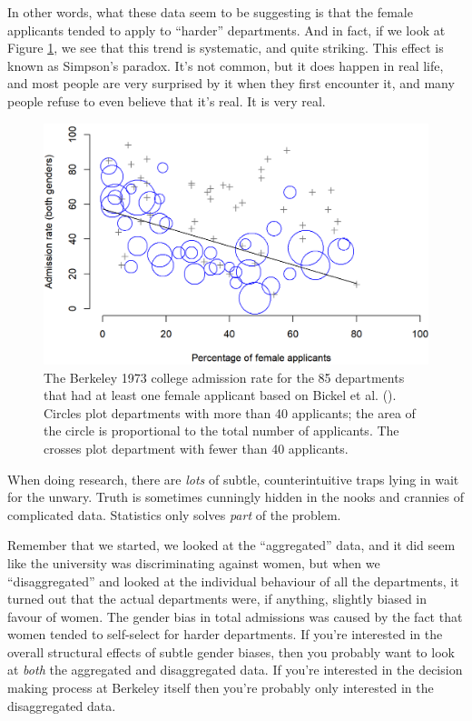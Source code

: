 \documentclass[
  11pt,
  a4paper,
  twoside,symmetric,openright]{book}
\theoremstyle{break}
\theoremstyle{break}
\begin{document}
In other words, what these data seem to be suggesting is that the female applicants tended to apply to ``harder'' departments. And in fact, if we look at Figure \ref{fig:berkeley}, we see that this trend is systematic, and quite striking. This effect is known as Simpson's paradox. It's not common, but it does happen in real life, and most people are very surprised by it when they first encounter it, and many people refuse to even believe that it's real. It is very real.

\begin{figure}

{\centering \includegraphics[width=0.6\linewidth]{resources/image/berkeley} 

}

\caption[The Berkeley 1973 college admissions data.]{The Berkeley 1973 college admission rate for the 85 departments that had at least one female applicant based on Bickel et al. (). Circles plot departments with more than 40 applicants; the area of the circle is proportional to the total number of applicants. The crosses plot department with fewer than 40 applicants.}\label{fig:berkeley}
\end{figure}



When doing research, there are \emph{lots} of subtle, counterintuitive traps lying in wait for the unwary. Truth is sometimes cunningly hidden in the nooks and crannies of complicated data. Statistics only solves \emph{part} of the problem.

Remember that we started, we looked at the ``aggregated'' data, and it did seem like the university was discriminating against women, but when we ``disaggregated'' and looked at the individual behaviour of all the departments, it turned out that the actual departments were, if anything, slightly biased in favour of women. The gender bias in total admissions was caused by the fact that women tended to self-select for harder departments. If you're interested in the overall structural effects of subtle gender biases, then you probably want to look at \emph{both} the aggregated and disaggregated data. If you're interested in the decision making process at Berkeley itself then you're probably only interested in the disaggregated data.
\end{document}
